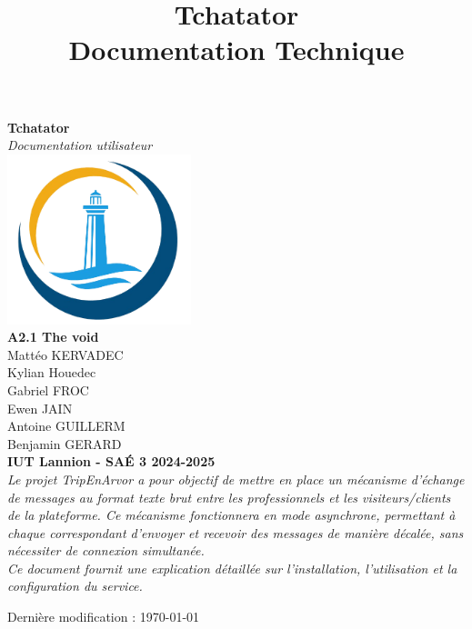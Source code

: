 \documentclass{report}
\title{\Huge Tchatator \\ {\LARGE Documentation Technique}}
\begin{document}
\begin{titlepage}
    \begin{center}
        {\Huge\bfseries Tchatator} \\[1cm]
        {\Large\textit{Documentation utilisateur}} \\[2cm]

        \includegraphics[width=0.4\textwidth]{../../../html/img/logo.png} \\[2cm]

        {\Large \textbf{A2.1 The void}} \\ [.2cm]
        {\large Mattéo KERVADEC } \\[.2cm]
        {\large Kylian Houedec } \\[.2cm]
        {\large Gabriel FROC } \\[.2cm]
        {\large Ewen JAIN } \\[.2cm]
        {\large Antoine GUILLERM } \\[.2cm]
        {\large Benjamin GERARD } \\[1cm]

        \textbf{IUT Lannion - SAÉ 3 2024-2025} \\[1.2cm]

        \textit{
        Le projet TripEnArvor a pour objectif de mettre en place un mécanisme d’échange de messages au format texte brut entre les professionnels et les visiteurs/clients de la plateforme. Ce mécanisme fonctionnera en mode asynchrone, permettant à chaque correspondant d’envoyer et recevoir des messages de manière décalée, sans nécessiter de connexion simultanée. 
		} \\[0.5cm]
		
		\textit{
        Ce document fournit une explication détaillée sur l'installation, l'utilisation et la configuration du service.
		}

        \vfill  %

        {\small Dernière modification : \today}
    \end{center}
\end{titlepage}
\end{document}
